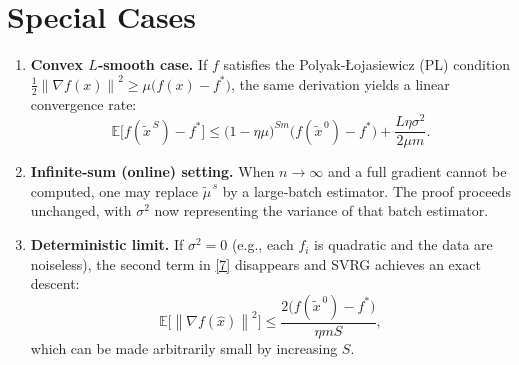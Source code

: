 \documentclass{article}
\newcommand{\EE}{\mathbb{E}}
\newcommand{\norm}[1]{\left\|#1\right\|}
\newcommand{\grad}{\nabla}
\begin{document}
\section*{Special Cases}
\begin{enumerate}[label=\alph*)]
\item \textbf{Convex $L$‑smooth case.} If $f$ satisfies the Polyak‑Łojasiewicz (PL) condition $\frac{1}{2}\norm{\grad f(x)}^{2}\ge \mu\bigl(f(x)-f^{*}\bigr)$, the same derivation yields a linear convergence rate:
\[
\EE\!\bigl[f(\tilde{x}^{\,S})-f^{*}\bigr]\le
\bigl(1-\eta\mu\bigr)^{Sm}\bigl(f(\tilde{x}^{\,0})-f^{*}\bigr)+\frac{L\eta\sigma^{2}}{2\mu m}.
\]

\item \textbf{Infinite‑sum (online) setting.} When $n\to\infty$ and a full gradient cannot be computed, one may replace $\tilde{\mu}^{\,s}$ by a large‑batch estimator. The proof proceeds unchanged, with $\sigma^{2}$ now representing the variance of that batch estimator.

\item \textbf{Deterministic limit.} If $\sigma^{2}=0$ (e.g., each $f_i$ is quadratic and the data are noiseless), the second term in \eqref{7} disappears and SVRG achieves an exact descent:
\[
\EE\!\bigl[\norm{\grad f(\hat{x})}^{2}\bigr]\le
\frac{2\bigl(f(\tilde{x}^{\,0})-f^{*}\bigr)}{\eta m S},
\]
which can be made arbitrarily small by increasing $S$.
\end{enumerate}
\end{document}
